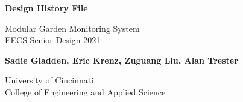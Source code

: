 \begin{titlepage}
    \begin{center}
        \vspace*{1cm}
            
        \Huge
        \textbf{Design History File}
            
        \vspace{0.5cm}
        \Large
        Modular Garden Monitoring System\\
        EECS Senior Design 2021
            
        \vspace{1.5cm}
        
        \Large
        \textbf{Sadie Gladden, Eric Krenz, Zuguang Liu, Alan Trester}
            
        \vfill
            
        University of Cincinnati\\
        College of Engineering and Applied Science
            
        \vspace{0.8cm}
            
            
    \end{center}
\end{titlepage}